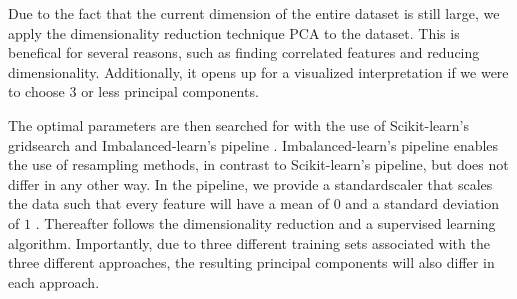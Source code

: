 

\noindent Due to the fact that the current dimension of the entire dataset is still large, we apply the dimensionality reduction technique PCA to the dataset. This is benefical for several reasons, such as finding correlated features and reducing dimensionality. Additionally, it opens up for a visualized interpretation if we were to choose $3$ or less principal components.

The optimal parameters are then searched for with the use of Scikit-learn's gridsearch \cite{Pedregosa2012} and Imbalanced-learn's pipeline \cite{Lemaitre2016}. Imbalanced-learn's pipeline enables the use of resampling methods, in contrast to Scikit-learn's pipeline, but does not differ in any other way. In the pipeline, we provide a standardscaler that scales the data such that every feature will have a mean of $0$ and a standard deviation of $1$ \cite{Pedregosa2012}. Thereafter follows the dimensionality reduction and a supervised learning algorithm. Importantly, due to three different training sets associated with the three different approaches, the resulting principal components will also differ in each approach.
